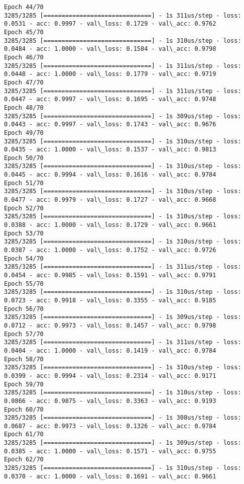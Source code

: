 \documentclass[11pt]{article}
\begin{document}
\begin{Verbatim}[commandchars=\\\{\}]
Epoch 44/70
3285/3285 [==============================] - 1s 311us/step - loss: 0.0531 - acc: 0.9997 - val\_loss: 0.1729 - val\_acc: 0.9762
Epoch 45/70
3285/3285 [==============================] - 1s 310us/step - loss: 0.0484 - acc: 1.0000 - val\_loss: 0.1584 - val\_acc: 0.9798
Epoch 46/70
3285/3285 [==============================] - 1s 311us/step - loss: 0.0448 - acc: 1.0000 - val\_loss: 0.1779 - val\_acc: 0.9719
Epoch 47/70
3285/3285 [==============================] - 1s 311us/step - loss: 0.0447 - acc: 0.9997 - val\_loss: 0.1695 - val\_acc: 0.9748
Epoch 48/70
3285/3285 [==============================] - 1s 309us/step - loss: 0.0443 - acc: 0.9997 - val\_loss: 0.1743 - val\_acc: 0.9676
Epoch 49/70
3285/3285 [==============================] - 1s 310us/step - loss: 0.0435 - acc: 1.0000 - val\_loss: 0.1537 - val\_acc: 0.9813
Epoch 50/70
3285/3285 [==============================] - 1s 310us/step - loss: 0.0445 - acc: 0.9994 - val\_loss: 0.1616 - val\_acc: 0.9784
Epoch 51/70
3285/3285 [==============================] - 1s 310us/step - loss: 0.0477 - acc: 0.9979 - val\_loss: 0.1727 - val\_acc: 0.9668
Epoch 52/70
3285/3285 [==============================] - 1s 310us/step - loss: 0.0388 - acc: 1.0000 - val\_loss: 0.1729 - val\_acc: 0.9661
Epoch 53/70
3285/3285 [==============================] - 1s 310us/step - loss: 0.0387 - acc: 1.0000 - val\_loss: 0.1752 - val\_acc: 0.9726
Epoch 54/70
3285/3285 [==============================] - 1s 311us/step - loss: 0.0454 - acc: 0.9985 - val\_loss: 0.1591 - val\_acc: 0.9791
Epoch 55/70
3285/3285 [==============================] - 1s 310us/step - loss: 0.0723 - acc: 0.9918 - val\_loss: 0.3355 - val\_acc: 0.9185
Epoch 56/70
3285/3285 [==============================] - 1s 309us/step - loss: 0.0712 - acc: 0.9973 - val\_loss: 0.1457 - val\_acc: 0.9798
Epoch 57/70
3285/3285 [==============================] - 1s 311us/step - loss: 0.0404 - acc: 1.0000 - val\_loss: 0.1419 - val\_acc: 0.9784
Epoch 58/70
3285/3285 [==============================] - 1s 310us/step - loss: 0.0399 - acc: 0.9994 - val\_loss: 0.2314 - val\_acc: 0.9171
Epoch 59/70
3285/3285 [==============================] - 1s 310us/step - loss: 0.0866 - acc: 0.9875 - val\_loss: 0.3363 - val\_acc: 0.9193
Epoch 60/70
3285/3285 [==============================] - 1s 308us/step - loss: 0.0687 - acc: 0.9973 - val\_loss: 0.1326 - val\_acc: 0.9784
Epoch 61/70
3285/3285 [==============================] - 1s 309us/step - loss: 0.0385 - acc: 1.0000 - val\_loss: 0.1571 - val\_acc: 0.9755
Epoch 62/70
3285/3285 [==============================] - 1s 310us/step - loss: 0.0370 - acc: 1.0000 - val\_loss: 0.1691 - val\_acc: 0.9661

\end{Verbatim}
\end{document}
